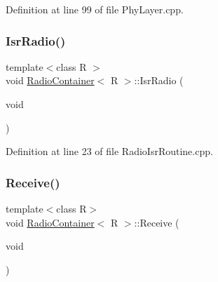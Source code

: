 Definition at line 99 of file Phy\+Layer.\+cpp.

\mbox{\label{class_radio_container_a4ea6769301a5aaa8e33e22562e024619}} 
\subsubsection{\texorpdfstring{Isr\+Radio()}{IsrRadio()}}
{\footnotesize\ttfamily template$<$class R $>$ \\
void \mbox{\hyperlink{class_radio_container}{Radio\+Container}}$<$ R $>$\+::Isr\+Radio (\begin{DoxyParamCaption}\item[{void}]{ }\end{DoxyParamCaption})}



Definition at line 23 of file Radio\+Isr\+Routine.\+cpp.

\mbox{\label{class_radio_container_a9a7e676f1735ea1f67898d6e3014ded1}} 
\subsubsection{\texorpdfstring{Receive()}{Receive()}}
{\footnotesize\ttfamily template$<$class R$>$ \\
void \mbox{\hyperlink{class_radio_container}{Radio\+Container}}$<$ R $>$\+::Receive (\begin{DoxyParamCaption}\item[{void}]{ }\end{DoxyParamCaption})}

\mbox{\label{class_radio_container_aefcc86fb08cd1857cf6dcd8ba1bd7c90}} 
